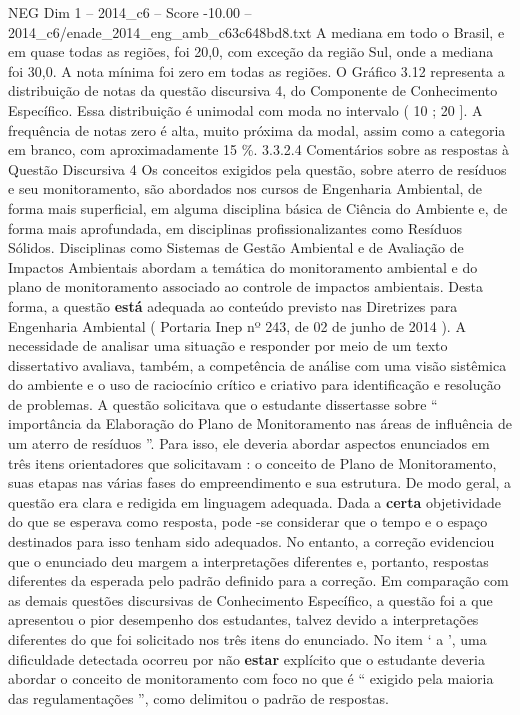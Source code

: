 \begin{textsample}{NEG Dim 1 – 2014\_c6 – Score -10.00 – 2014\_c6/enade\_2014\_eng\_amb\_c63c648bd8.txt}
A mediana em todo o Brasil, e em quase todas as regiões, foi 20,0, com exceção da região Sul, onde a mediana foi 30,0.
A nota mínima foi zero em todas as regiões.
O Gráfico 3.12 representa a distribuição de notas da questão discursiva 4, do Componente de Conhecimento Específico.
Essa distribuição é unimodal com moda no intervalo ( 10 ; 20 ].
A frequência de notas zero é alta, muito próxima da modal, assim como a categoria em branco, com aproximadamente 15 \%. 3.3.2.4 Comentários sobre as respostas à Questão Discursiva 4 Os conceitos exigidos pela questão, sobre aterro de resíduos e seu monitoramento, são abordados nos cursos de Engenharia Ambiental, de forma mais superficial, em alguma disciplina básica de Ciência do Ambiente e, de forma mais aprofundada, em disciplinas profissionalizantes como Resíduos Sólidos.
Disciplinas como Sistemas de Gestão Ambiental e de Avaliação de Impactos Ambientais abordam a temática do monitoramento ambiental e do plano de monitoramento associado ao controle de impactos ambientais.
Desta forma, a questão \textbf{está} adequada ao conteúdo previsto nas Diretrizes para Engenharia Ambiental ( Portaria Inep nº 243, de 02 de junho de 2014 ).
A necessidade de analisar uma situação e responder por meio de um texto dissertativo avaliava, também, a competência de análise com uma visão sistêmica do ambiente e o uso de raciocínio crítico e criativo para identificação e resolução de problemas.
A questão solicitava que o estudante dissertasse sobre “ importância da Elaboração do Plano de Monitoramento nas áreas de influência de um aterro de resíduos ”.
Para isso, ele deveria abordar aspectos enunciados em três itens orientadores que solicitavam : o conceito de Plano de Monitoramento, suas etapas nas várias fases do empreendimento e sua estrutura.
De modo geral, a questão era clara e redigida em linguagem adequada.
Dada a \textbf{certa} objetividade do que se esperava como resposta, pode -se considerar que o tempo e o espaço destinados para isso tenham sido adequados.
No entanto, a correção evidenciou que o enunciado deu margem a interpretações diferentes e, portanto, respostas diferentes da esperada pelo padrão definido para a correção.
Em comparação com as demais questões discursivas de Conhecimento Específico, a questão foi a que apresentou o pior desempenho dos estudantes, talvez devido a interpretações diferentes do que foi solicitado nos três itens do enunciado.
No item ‘ a ’, uma dificuldade detectada ocorreu por não \textbf{estar} explícito que o estudante deveria abordar o conceito de monitoramento com foco no que é “ exigido pela maioria das regulamentações ”, como delimitou o padrão de respostas.

\end{textsample}
